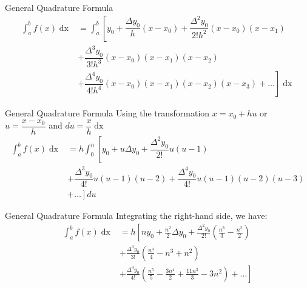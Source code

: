\documentclass{beamer}
\begin{document}
\begin{frame}{General Quadrature Formula \cite{general_quadrature}}
      \begin{equation}
        \begin{aligned}
          \int_{a}^{b} f(x) \mathop{dx} &= \int_a^b \left[ y_0 + \dfrac{\Delta y_0}{h}\left(x - x_0\right) + \dfrac{\Delta^2 y_0}{2!h^2}\left(x - x_0\right)\left(x - x_1\right) \right. \\ 
          &+ \dfrac{\Delta^3 y_0}{3!h^3}\left(x - x_0\right)\left(x - x_1\right)\left(x - x_2\right) \\
          &+ \left. \dfrac{\Delta^4 y_0}{4!h^4}\left(x - x_0\right)\left(x - x_1\right)\left(x - x_2\right)\left(x - x_3\right) + \dots \right] \mathop{dx}
        \end{aligned}
      \end{equation}
\end{frame}

\begin{frame}{General Quadrature Formula \cite{general_quadrature}}
  Using the transformation $x = x_0 + hu$ or $u = \dfrac{x - x_0}{h}$ and $du = \dfrac{x}{h} \mathop{dx}$
      \begin{equation*}
        \begin{aligned}
          \int_{a}^{b} f(x) \mathop{dx} &= h \int_0^n \left[ y_0 + u\Delta y_0 + \dfrac{\Delta^2 y_0}{2!} u\left(u - 1\right) \right. \\
          &+ \dfrac{\Delta^3 y_0}{4!} u\left(u - 1\right)\left(u - 2\right) + \dfrac{\Delta^4 y_0}{4!} u\left(u - 1\right)\left(u - 2\right)\left(u - 3\right) \\
          & + \left. \dots \right] du
        \end{aligned}
      \end{equation*}
\end{frame}

\begin{frame}{General Quadrature Formula \cite{general_quadrature}}
  Integrating the right-hand side, we have:
      \begin{equation}\label{quadrature}
        \begin{split}
          \int_{a}^{b} f(x) \mathop{dx} &= h\left[ny_0 + \frac{n^2}{2}\Delta y_0 + \frac{\Delta^2 y_0}{2!}\left(\frac{n^3}{3} - \frac{n^2}{2}\right) \right. \\
          &+ \frac{\Delta^3 y_0}{3!}\left(\frac{n^4}{4} - n^3 + n^2\right) \\ 
          &+ \left. \frac{\Delta^4 y_0}{4!}\left(\frac{n^5}{5} - \frac{3n^4}{2} + \frac{11n^3}{3} - 3n^2\right) + \dots \right]
        \end{split}
      \end{equation}
\end{frame}
\end{document}
